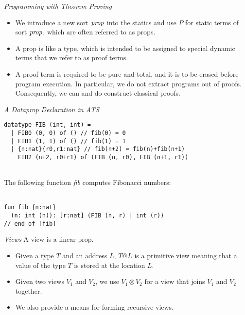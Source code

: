 \documentclass[pdf]{prosper}
\begin{document}
\begin{slide}{\em Programming with Theorem-Proving}
\begin{itemize}
\item
We introduce a new sort ${\it prop}$ into the statics and use $P$ for static
terms of sort ${\it prop}$, which are often referred to as props.
\item
A prop is like a type, which is intended to be assigned to special dynamic
terms that we refer to as proof terms.
\item
A proof term is required to be pure and total, and it is to be erased
before program execution. In particular, we do not extract programs out of
proofs. Consequently, we can and do construct classical proofs.
\end{itemize}
\end{slide}
\begin{slide}{\em A Dataprop Declaration in ATS}
{\blue\begin{verbatim}
datatype FIB (int, int) =
  | FIB0 (0, 0) of () // fib(0) = 0
  | FIB1 (1, 1) of () // fib(1) = 1
  | {n:nat}{r0,r1:nat} // fib(n+2) = fib(n)+fib(n+1)
    FIB2 (n+2, r0+r1) of (FIB (n, r0), FIB (n+1, r1))
\end{verbatim}
}
~\\
The following function {\it fib} computes Fibonacci numbers:
~\\~\\
{\blue\begin{verbatim}
fun fib {n:nat}
  (n: int (n)): [r:nat] (FIB (n, r) | int (r))
// end of [fib]
\end{verbatim}
}
\vfill
\end{slide}
\begin{slide}{\em Views}
A view is a linear prop.
\begin{itemize}
\item
Given a type $T$ and an address $L$, $T@L$ is a primitive view
meaning that a value of the type $T$ is stored at the location $L$.
\item
Given two views $V_1$ and $V_2$, we use $V_1\otimes V_2$ for a
view that joins $V_1$ and $V_2$ together.
\item
We also provide a means for forming recursive views. 
\end{itemize}
\end{slide}
\def\tptr{\mbox{\bf ptr}}
\def\fptrget{{\it ptrget}}
\def\fptrset{{\it ptrset}}
\end{document}
